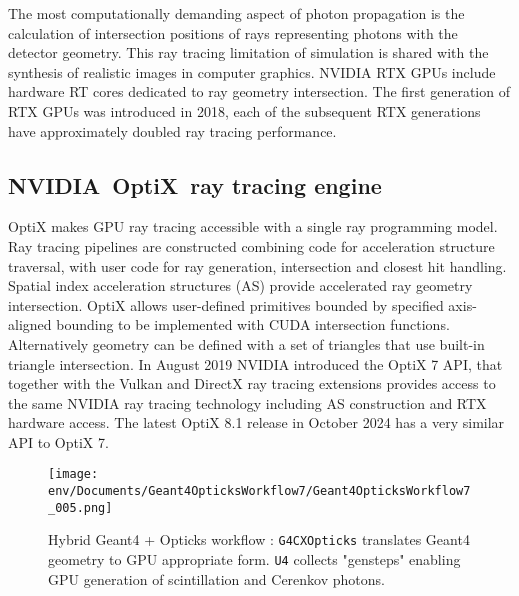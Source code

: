 \documentclass{webofc}
\begin{document}
The most computationally demanding aspect of photon propagation
is the calculation of intersection positions of rays representing photons with the detector geometry.
This ray tracing limitation of simulation is shared with the synthesis of realistic images in computer graphics. 
NVIDIA RTX\cite{rtx} GPUs include hardware RT cores dedicated to ray geometry intersection. 
The first generation of RTX GPUs was introduced in 2018, each of the subsequent RTX generations have 
approximately doubled ray tracing performance.  
%
%
\subsection{NVIDIA\textregistered\ OptiX\texttrademark\ ray tracing engine}
%
OptiX makes GPU ray tracing accessible with a single ray programming model.
Ray tracing pipelines are constructed combining code for acceleration structure traversal, 
with user code for ray generation, intersection and closest hit handling.
Spatial index acceleration structures (AS) provide accelerated ray geometry intersection. 
%
OptiX allows user-defined primitives bounded by specified axis-aligned bounding
to be implemented with CUDA intersection functions. Alternatively geometry can be 
defined with a set of triangles that use built-in triangle intersection.  
%
In August 2019 NVIDIA introduced the OptiX 7 API\cite{optix7},
that together with the Vulkan and DirectX ray tracing extensions provides access 
to the same NVIDIA ray tracing technology including AS construction and RTX hardware access. 
The latest OptiX 8.1 release in October 2024 has a very similar API to OptiX 7.   
%
%
\begin{figure}[t]
\centering
\texttt{[image: env/Documents/Geant4OpticksWorkflow7/Geant4OpticksWorkflow7\_005.png]}
\caption{Hybrid Geant4 + Opticks workflow : {\tt G4CXOpticks} translates Geant4 geometry to GPU appropriate form. 
{\tt U4} collects "gensteps" enabling GPU generation of scintillation and Cerenkov photons.
}
\label{workflow} 
\vspace{-5mm}
\end{figure}
%
\end{document}
